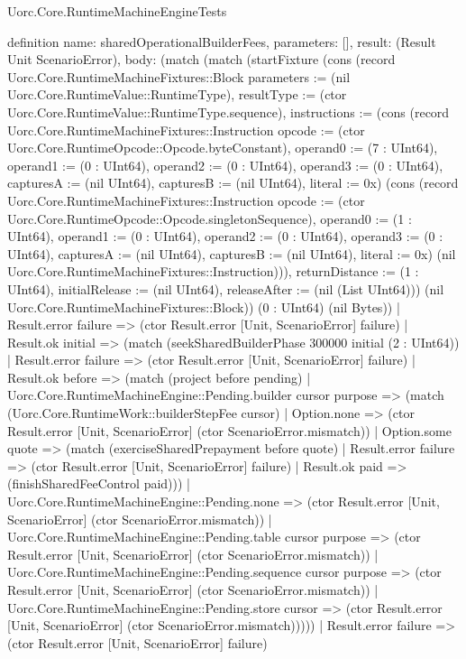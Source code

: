 \begin{lexlean}{Uorc.Core.RuntimeMachineEngineTests}
\begin{semanticmodule}
definition{
  name: sharedOperationalBuilderFees,
  parameters: [],
  result: (Result Unit ScenarioError),
  body: (match (match (startFixture (cons (record Uorc.Core.RuntimeMachineFixtures::Block {parameters := (nil Uorc.Core.RuntimeValue::RuntimeType), resultType := (ctor Uorc.Core.RuntimeValue::RuntimeType.sequence), instructions := (cons (record Uorc.Core.RuntimeMachineFixtures::Instruction {opcode := (ctor Uorc.Core.RuntimeOpcode::Opcode.byteConstant), operand0 := (7 : UInt64), operand1 := (0 : UInt64), operand2 := (0 : UInt64), operand3 := (0 : UInt64), capturesA := (nil UInt64), capturesB := (nil UInt64), literal := 0x}) (cons (record Uorc.Core.RuntimeMachineFixtures::Instruction {opcode := (ctor Uorc.Core.RuntimeOpcode::Opcode.singletonSequence), operand0 := (1 : UInt64), operand1 := (0 : UInt64), operand2 := (0 : UInt64), operand3 := (0 : UInt64), capturesA := (nil UInt64), capturesB := (nil UInt64), literal := 0x}) (nil Uorc.Core.RuntimeMachineFixtures::Instruction))), returnDistance := (1 : UInt64), initialRelease := (nil UInt64), releaseAfter := (nil (List UInt64))}) (nil Uorc.Core.RuntimeMachineFixtures::Block)) (0 : UInt64) (nil Bytes))
      | Result.error failure => (ctor Result.error [Unit, ScenarioError] failure)
      | Result.ok initial => (match (seekSharedBuilderPhase 300000 initial (2 : UInt64))
        | Result.error failure => (ctor Result.error [Unit, ScenarioError] failure)
        | Result.ok before => (match (project before pending)
          | Uorc.Core.RuntimeMachineEngine::Pending.builder cursor purpose => (match (Uorc.Core.RuntimeWork::builderStepFee cursor)
            | Option.none => (ctor Result.error [Unit, ScenarioError] (ctor ScenarioError.mismatch))
            | Option.some quote => (match (exerciseSharedPrepayment before quote)
              | Result.error failure => (ctor Result.error [Unit, ScenarioError] failure)
              | Result.ok paid => (finishSharedFeeControl paid)))
          | Uorc.Core.RuntimeMachineEngine::Pending.none => (ctor Result.error [Unit, ScenarioError] (ctor ScenarioError.mismatch))
          | Uorc.Core.RuntimeMachineEngine::Pending.table cursor purpose => (ctor Result.error [Unit, ScenarioError] (ctor ScenarioError.mismatch))
          | Uorc.Core.RuntimeMachineEngine::Pending.sequence cursor purpose => (ctor Result.error [Unit, ScenarioError] (ctor ScenarioError.mismatch))
          | Uorc.Core.RuntimeMachineEngine::Pending.store cursor => (ctor Result.error [Unit, ScenarioError] (ctor ScenarioError.mismatch)))))
    | Result.error failure => (ctor Result.error [Unit, ScenarioError] failure)
}
\end{semanticmodule}
\end{lexlean}
